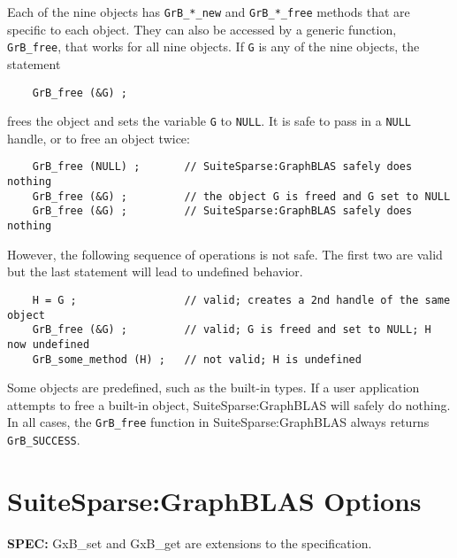 \documentclass[12pt]{article}
\begin{document}
Each of the nine objects has \verb'GrB_*_new' and \verb'GrB_*_free' methods
that are specific to each object.  They can also be accessed by a generic
function, \verb'GrB_free', that works for all nine objects.  If \verb'G' is any
of the nine objects, the statement

    {\footnotesize
    \begin{verbatim}
    GrB_free (&G) ; \end{verbatim} }

\noindent
frees the object and sets the variable \verb'G' to \verb'NULL'.  It is safe to
pass in a \verb'NULL' handle, or to free an object twice:

    {\footnotesize
    \begin{verbatim}
    GrB_free (NULL) ;       // SuiteSparse:GraphBLAS safely does nothing
    GrB_free (&G) ;         // the object G is freed and G set to NULL
    GrB_free (&G) ;         // SuiteSparse:GraphBLAS safely does nothing \end{verbatim} }

\noindent
However, the following sequence of operations is not safe.  The first two are
valid but the last statement will lead to undefined behavior.

    {\footnotesize
    \begin{verbatim}
    H = G ;                 // valid; creates a 2nd handle of the same object
    GrB_free (&G) ;         // valid; G is freed and set to NULL; H now undefined
    GrB_some_method (H) ;   // not valid; H is undefined \end{verbatim}}

Some objects are predefined, such as the built-in types.  If a user application
attempts to free a built-in object, SuiteSparse:GraphBLAS will safely do
nothing.  In all cases, the \verb'GrB_free' function in SuiteSparse:GraphBLAS
always returns \verb'GrB_SUCCESS'.




\newpage
\section{SuiteSparse:GraphBLAS Options} %
\label{options}

\begin{spec}
{\bf SPEC:} {\sf GxB\_set} and {\sf GxB\_get} are extensions to the
specification.
\end{spec}
\end{document}
